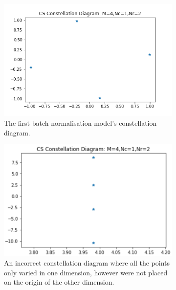 \documentclass[12pt,onecolumn,letterpaper]{article}
\begin{document}
\begin{figure}[t!]
   \centering
   \begin{subfigure}[t]{0.24\textwidth}
       \centering
       \includegraphics[width=\linewidth]{figures/ae2_2_correctish_relu_const_diag.png}
       \caption{The first batch normalisation model's constellation diagram.}
   \end{subfigure}
   \hfill
   \begin{subfigure}[t]{0.24\textwidth}
       \centering
       \includegraphics[width=\linewidth]{figures/ae2_2_wrong_const_diag_1d.png}
       \caption{An incorrect constellation diagram where all the points only varied in one dimension, however were not placed on the origin of the other dimension.}
   \end{subfigure}
   \hfill
   \begin{subfigure}[t]{0.24\textwidth}
       \centering

\end{subfigure}
\end{figure}
\end{document}
